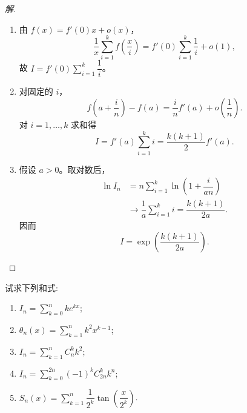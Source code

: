 \documentclass[../../数学分析培优讲义(答案版).tex]{subfiles}
\begin{document}
\begin{proof}[解]
\begin{enumerate}[label=(\arabic*)]
    \item 由 $f(x)=f'(0)x+o(x)$，
    \[
        \dfrac{1}{x}\sum\limits_{i=1}^{k}f\left(\dfrac{x}{i}\right)
        =f'(0)\sum\limits_{i=1}^{k}\dfrac{1}{i}+o(1),
    \]
    故 $I=f'(0)\displaystyle\sum\limits_{i=1}^{k}\dfrac{1}{i}$。
    \item 对固定的 $i$，
    \[
        f\left(a+\dfrac{i}{n}\right)-f(a)
        =\dfrac{i}{n}f'(a)+o\left(\dfrac{1}{n}\right).
    \]
    对 $i=1,\ldots,k$ 求和得
    \[
        I=f'(a)\sum\limits_{i=1}^{k}i
        =\dfrac{k(k+1)}{2}f'(a).
    \]
    \item 假设 $a>0$。取对数后，
    \[
    \begin{aligned}
        \ln I_n
        &=n\sum\limits_{i=1}^{k}
        \ln\left(1+\dfrac{i}{an}\right)\\
        &\longrightarrow\dfrac{1}{a}\sum\limits_{i=1}^{k}i
        =\dfrac{k(k+1)}{2a}.
    \end{aligned}
    \]
    因而
    \[
        I=\exp\left(\dfrac{k(k+1)}{2a}\right).
    \]
\end{enumerate}
\end{proof}

\begin{example}
试求下列和式:
\begin{enumerate}[label=(\arabic*)]
    \item $\displaystyle I_n=\sum\limits_{k=0}^n ke^{kx}$;
    \item $\displaystyle \theta_n(x)=\sum\limits_{k=1}^n k^2x^{k-1}$;
    \item $\displaystyle I_n=\sum\limits_{k=1}^n C_{n}^{k}k^2$;
    \item $\displaystyle I_n=\sum\limits_{k=0}^{2n}(-1)^k C_{2n}^{k}k^n$;
    \item $\displaystyle S_n(x)=\sum\limits_{k=1}^n\dfrac{1}{2^k}\tan\left(\dfrac{x}{2^k}\right)$.
\end{enumerate}
\end{example}
\end{document}
